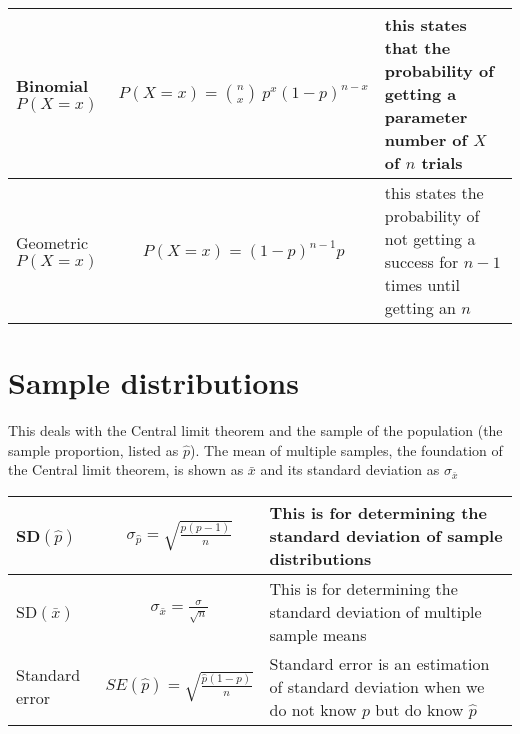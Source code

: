 \documentclass{article}
\begin{document}
\begin{center}
\begin{tabular}{ >{\centering\arraybackslash}m{4cm} c m{6cm} } \hline
Binomial $P(X=x)$ & $P(X=x) = \binom{n}{x} \ p^x \left( 1 - p \right) ^ {n-x} $ & this states that the probability of getting a parameter number of $X$ of $n$ trials \\ \hline
Geometric $P(X=x)$ & $P\left(X=x\right) = \left ( 1 - p\right )^{n-1}p$ & this states the probability of not getting a success for $n-1$ times until getting an $n$ \\ \hline
\end{tabular}
\end{center}

\section{Sample distributions}
This deals with the Central limit theorem and the sample of the population (the sample proportion, listed as $\hat{p}$). The mean of multiple samples, the foundation of the Central limit theorem, is shown as $\bar{x}$ and its standard deviation as $\sigma_{\bar{x}}$
\begin{center}
\begin{tabular}{ >{\centering\arraybackslash}m{4cm} c m{6cm} } \hline
SD$\left ( \hat{p} \right )$ & $\sigma_{\hat{p}} = \sqrt{\frac{p(p-1)}{n}}$ & This is for determining the standard deviation of sample distributions \\ \hline
SD$\left ( \bar{x} \right )$ & $\sigma_{\bar{x}}=\frac{\sigma}{\sqrt{n}}$ & This is for determining the standard deviation of multiple sample means \\ \hline
Standard error & $SE(\hat{p}) = \sqrt{\frac{\hat{p}\left( 1 - \hat{p} \right)}{n}}$ & Standard error is an estimation of standard deviation when we do not know $p$ but do know $\hat{p}$ \\ \hline

\end{tabular}
\end{center}
\end{document}

